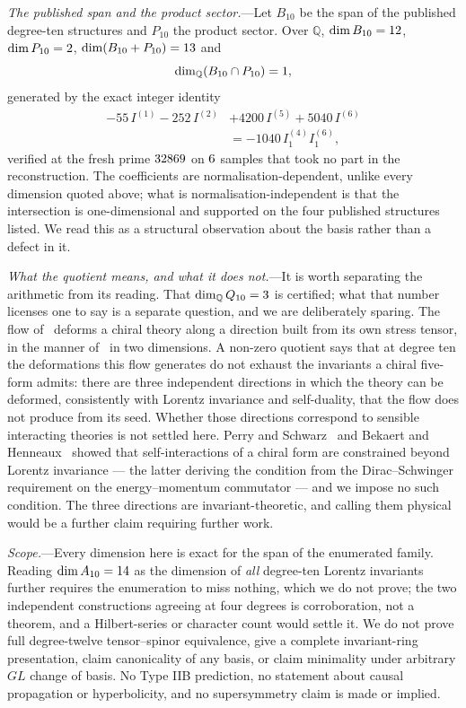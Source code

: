 \documentclass[
  aps,prd,
  reprint,
  letterpaper,
  amsmath,amssymb,
  nofootinbib,
  superscriptaddress
]{revtex4-2}
\theoremstyle{plain}
\newcommand{\Ften}{A_{10}}
\newcommand{\Qten}{Q_{10}}
\newcommand{\Bten}{B_{10}}
\newcommand{\Pten}{P_{10}}
\newcommand{\Q}{\mathbb{Q}}
\begin{document}
\emph{The published span and the product sector.}---Let $\Bten$ be the span of
the published degree-ten structures and $\Pten$ the product sector. Over $\Q$,
$\dim\Bten=\dimBten$, $\dim\Pten=\dimPten$, $\dim(\Bten+\Pten)=\dimBplusP$ and
\begin{equation}
\dim_\Q(\Bten\cap\Pten)=\dimBcapP,
\end{equation}
generated by the exact integer identity
\begin{equation}
\begin{split}
-55\,I^{(1)}-252\,I^{(2)}&+4200\,I^{(5)}+5040\,I^{(6)}\\
&=-1040\,I^{(4)}_1I^{(6)}_1 ,
\end{split}
\end{equation}
verified at the fresh prime $32869$ on $6$ samples that
took no part in the reconstruction. The coefficients are
normalisation-dependent, unlike every dimension quoted above; what is
normalisation-independent is that the intersection is one-dimensional and
supported on the four published structures listed. We read this as a structural
observation about the basis rather than a defect in it.

\emph{What the quotient means, and what it does not.}---It is worth separating
the arithmetic from its reading. That $\dim_\Q\Qten=\dimQtenQ$ is certified; what
that number licenses one to say is a separate question, and we are deliberately
sparing. The flow of~\cite{Hutomo:2025chiral} deforms a chiral theory along a
direction built from its own stress tensor, in the manner
of~\cite{Zamolodchikov:2004ce,Smirnov:2016lqw,Cavaglia:2016oda,Conti:2018tca} in
two dimensions. A non-zero quotient says that at degree ten the deformations
this flow generates do not exhaust the invariants a chiral five-form admits:
there are three independent directions in which the theory can be deformed,
consistently with Lorentz invariance and self-duality, that the flow does not
produce from its seed. Whether those directions correspond to sensible
interacting theories is not settled here. Perry and Schwarz~\cite{Perry:1996mk}
and Bekaert and Henneaux~\cite{Bekaert:1998yp} showed that self-interactions of
a chiral form are constrained beyond Lorentz invariance --- the latter deriving
the condition from the Dirac--Schwinger requirement on the energy--momentum
commutator --- and we impose no such condition. The three directions are
invariant-theoretic, and calling them physical would be a further claim
requiring further work.

\emph{Scope.}---Every dimension here is exact for the span of the enumerated
family. Reading $\dim\Ften=\dimAtenQ$ as the dimension of \emph{all} degree-ten
Lorentz invariants further requires the enumeration to miss nothing, which we do
not prove; the two independent constructions agreeing at four degrees is
corroboration, not a theorem, and a Hilbert-series or character count would
settle it. We do not prove full degree-twelve tensor--spinor equivalence, give a
complete invariant-ring presentation, claim canonicality of any basis, or claim
minimality under arbitrary $GL$ change of basis. No Type IIB prediction, no
statement about causal propagation or hyperbolicity, and no supersymmetry claim
is made or implied.
\end{document}
